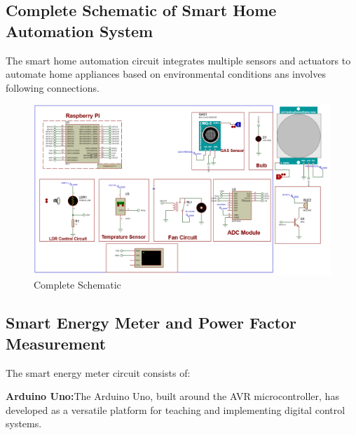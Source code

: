 \documentclass[a4paper,12pt]{report}
\begin{document}
\subsection{Complete Schematic of Smart Home Automation System}
The smart home automation circuit integrates multiple sensors and actuators to automate home appliances based on environmental conditions ans involves following connections.
\begin{figure}[H]  %
    \centering
    \includegraphics[scale=0.68]{smartHomeAutocomplete.PNG} %
    \caption{Complete Schematic}
    \label{fig:schematichome} %
\end{figure}



\subsection{Smart Energy Meter and Power Factor Measurement}
The smart energy meter circuit consists of:

\textbf{Arduino Uno:}The Arduino Uno, built around the AVR microcontroller, has developed as a versatile platform for teaching and implementing digital control systems.  
\end{document}
